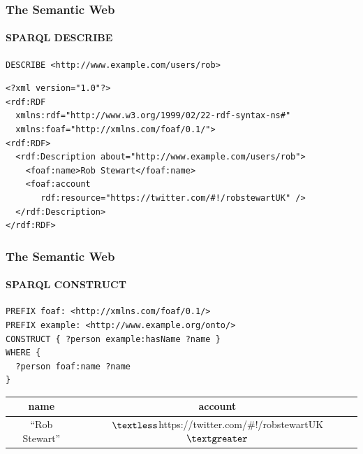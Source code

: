 \documentclass{beamer}
\begin{document}
\begin{frame}[fragile]
\frametitle{The Semantic Web}
\framesubtitle{SPARQL DESCRIBE}


\begin{verbatim}
DESCRIBE <http://www.example.com/users/rob>
\end{verbatim}

\bigskip

\begin{center}
\small
\begin{verbatim}
<?xml version="1.0"?>
<rdf:RDF
  xmlns:rdf="http://www.w3.org/1999/02/22-rdf-syntax-ns#"
  xmlns:foaf="http://xmlns.com/foaf/0.1/">
<rdf:RDF>
  <rdf:Description about="http://www.example.com/users/rob">
    <foaf:name>Rob Stewart</foaf:name>
    <foaf:account
       rdf:resource="https://twitter.com/#!/robstewartUK" />
  </rdf:Description>
</rdf:RDF>
\end{verbatim}
\end{center}

\end{frame}


\begin{frame}[fragile]
\frametitle{The Semantic Web}
\framesubtitle{SPARQL CONSTRUCT}


\begin{verbatim}
PREFIX foaf: <http://xmlns.com/foaf/0.1/>
PREFIX example: <http://www.example.org/onto/>
CONSTRUCT { ?person example:hasName ?name }
WHERE {
  ?person foaf:name ?name
}
\end{verbatim}

\bigskip

\begin{center}
\begin{tabular}{| c | c | }
\hline
\textbf{name} & \textbf{account} \\
\hline
``Rob Stewart'' & $\textless$https://twitter.com/\#!/robstewartUK$\textgreater$ \\
\hline
\end{tabular}
\end{center}

\end{frame}
\end{document}
